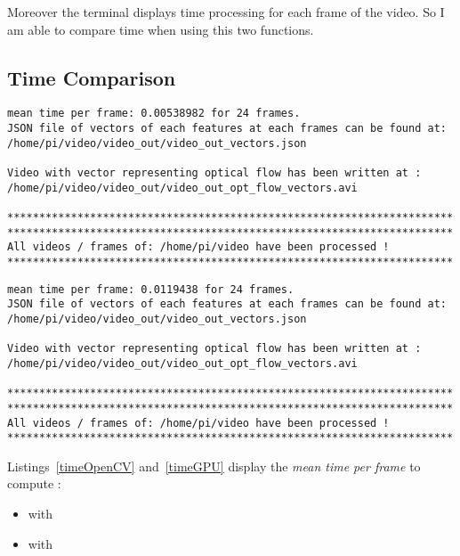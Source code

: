 Moreover the terminal displays time processing for each frame of the video. So I am able to compare time when using this two functions.


\subsection{Time Comparison}

\begin{lstlisting}
mean time per frame: 0.00538982 for 24 frames.
JSON file of vectors of each features at each frames can be found at: /home/pi/video/video_out/video_out_vectors.json

Video with vector representing optical flow has been written at : /home/pi/video/video_out/video_out_opt_flow_vectors.avi

**********************************************************************
**********************************************************************
All videos / frames of: /home/pi/video have been processed !
**********************************************************************
\end{lstlisting}


\begin{lstlisting}
mean time per frame: 0.0119438 for 24 frames.
JSON file of vectors of each features at each frames can be found at: /home/pi/video/video_out/video_out_vectors.json

Video with vector representing optical flow has been written at : /home/pi/video/video_out/video_out_opt_flow_vectors.avi

**********************************************************************
**********************************************************************
All videos / frames of: /home/pi/video have been processed !
**********************************************************************
\end{lstlisting}

Listings~\ref{timeOpenCV} and~\ref{timeGPU} display the \emph{mean time per frame} to compute \flow{}:
\begin{itemize}
	\item {} with 
	\item {} with 
\end{itemize}

